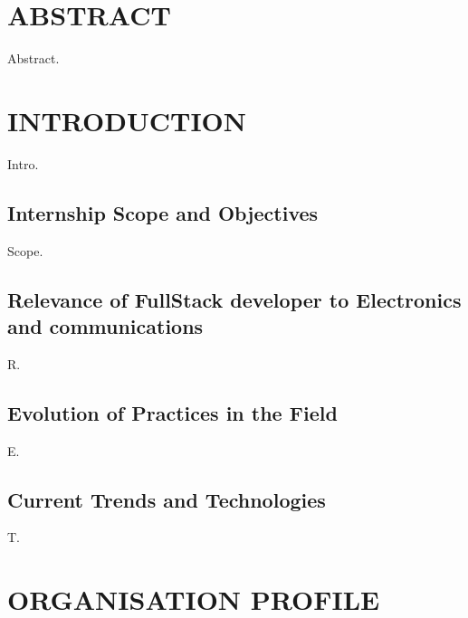 \documentclass[12pt,a4paper]{report}
\begin{document}
\newpage
\chapter*{ABSTRACT}


Abstract.


\newpage
\tableofcontents
{}

\newpage
\listoffigures
{}

\chapter{INTRODUCTION}


Intro.


\section{Internship Scope and Objectives}

Scope.


\section{Relevance of FullStack developer to Electronics and communications}

R.


\section{Evolution of Practices in the Field}

E.


\section{Current Trends and Technologies}

T.




\chapter{ORGANISATION PROFILE}
\end{document}
